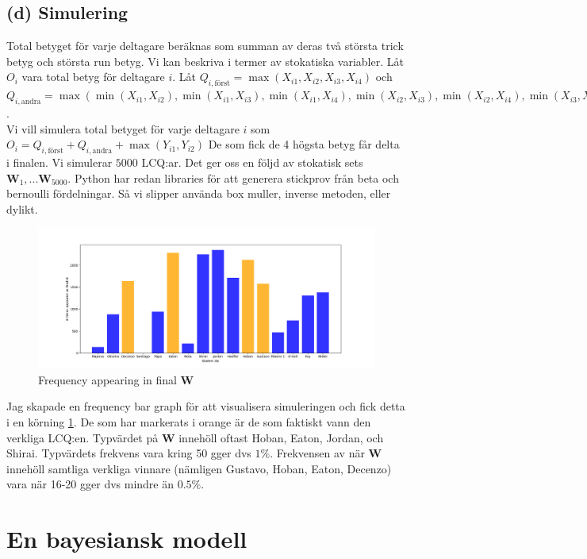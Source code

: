 \documentclass{assignment}
\begin{document}
\subsection*{(d) Simulering}
Total betyget för varje deltagare beräknas som summan av deras två största trick betyg och största run betyg. Vi
kan beskriva i termer av stokatiska variabler. Låt $O_i$ vara total betyg för deltagare $i$.
Låt $Q_{i,\text{först}}=\max(X_{i1},X_{i2},X_{i3},X_{i4})$ och 
\\$Q_{i,\text{andra}}=\max(\min(X_{i1}, X_{i2}), \min(X_{i1}, X_{i3}), \min(X_{i1}, X_{i4}), \min(X_{i2}, X_{i3}), \min(X_{i2}, X_{i4}), \min(X_{i3}, X_{i4}))$.
\\Vi vill simulera total betyget för varje deltagare $i$ som $O_i=Q_{i,\text{först}}+Q_{i,\text{andra}}+\max(Y_{i1},Y_{i2})$
De som fick de 4 högsta betyg får delta i finalen. Vi simulerar $5000$ LCQ:ar. Det ger oss en följd av stokatisk sets $\mathbf{W}_1,...\mathbf{W}_{5000}$.
Python har redan libraries för att generera stickprov från beta och bernoulli fördelningar. Så vi slipper 
använda box muller, inverse metoden, eller dylikt. 
\begin{figure}
    \caption{Frequency appearing in final $\mathbf{W}$}
    \begin{center}
        \includegraphics[width = 200mm]{assets/freq_bar_graph.png} 
    \end{center}
    \label{Histogram 2}
\end{figure}
Jag skapade en frequency bar graph för att visualisera simuleringen och fick detta i en körning \cref{Histogram 2}.
De som har markerats i orange är de som faktiskt vann den verkliga LCQ:en.
Typvärdet på $\mathbf{W}$ innehöll oftast Hoban, Eaton, Jordan, och Shirai. Typvärdets frekvens vara kring 50 gger dvs $1\%$. 
Frekvensen av när $\mathbf{W}$ innehöll samtliga verkliga vinnare (nämligen Gustavo, Hoban, Eaton, Decenzo) vara när 16-20 gger dvs mindre än $0.5\%$.  

\newpage 
\section{En bayesiansk modell}
\end{document}
